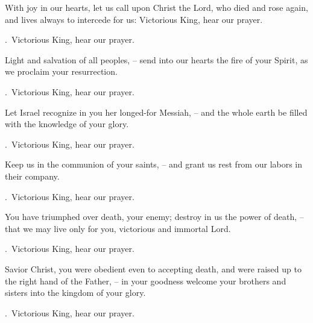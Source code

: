 \lettrine[loversize=0.15,lines=2]{W}{}ith joy in our hearts, let us call upon Christ the Lord, who died and rose again, and lives always to intercede for us: Victorious King, hear our prayer.
\par \Rbar.~Victorious King, hear our prayer.

Light and salvation of all peoples,
– send into our hearts the fire of your Spirit, as we proclaim your resurrection.
\par \Rbar.~Victorious King, hear our prayer.

Let Israel recognize in you her longed-for Messiah,
– and the whole earth be filled with the knowledge of your glory.
\par \Rbar.~Victorious King, hear our prayer.

Keep us in the communion of your saints,
– and grant us rest from our labors in their company.
\par \Rbar.~Victorious King, hear our prayer.

You have triumphed over death, your enemy; destroy in us the power of death,
– that we may live only for you, victorious and immortal Lord.
\par \Rbar.~Victorious King, hear our prayer.

Savior Christ, you were obedient even to accepting death, and were raised up to the right hand of the Father,
– in your goodness welcome your brothers and sisters into the kingdom of your glory.
\par \Rbar.~Victorious King, hear our prayer.
